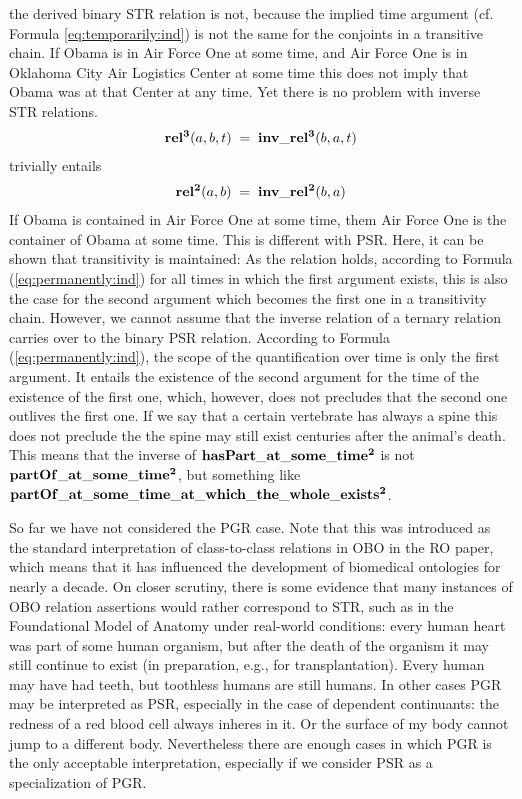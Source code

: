 %
the derived binary STR relation is not, because the implied time argument (cf. Formula \ref{eq:temporarily:ind}) is not the same for the conjoints in a transitive chain. If Obama is in Air Force One at some time, and Air Force One is in Oklahoma City Air Logistics Center at some time this does not imply that Obama was at that Center at any time.
Yet there is no problem with inverse STR relations. 
% 
\begin{equation}
\begin{split}
\mathrm{\mathbf{rel^3}}(a,b,t) \; = \; \mathrm{\mathbf{inv\_rel^3}}(b,a,t)  
\end{split}
\label{eq:trinv}
\end{equation}    
%
trivially entails
%
\begin{equation}
\begin{split}
\mathrm{\mathbf{rel^2}}(a,b) \; = \; \mathrm{\mathbf{inv\_rel^2}}(b,a)  
\end{split}
\label{eq:trinv2}
\end{equation}    
%
If Obama is contained in Air Force One at some time, them Air Force One is the container of Obama at some time.
%
This is different with PSR. Here, it can be shown that transitivity is maintained: As the relation holds, according to Formula (\ref{eq:permanently:ind}) for all times in which the first argument exists, this is also the case for the second argument which becomes the first one in a transitivity chain.
However, we cannot assume that the inverse relation of a ternary relation carries over to the binary PSR relation. According to Formula (\ref{eq:permanently:ind}), the scope of the quantification over time is only the first argument. It entails the existence of the second argument for the time of the existence of the first one, which, however, does not precludes that the second one outlives the first one. If we say that a certain vertebrate has always a spine this does not preclude the the spine may still exist centuries after the animal's death.    
This means that the inverse of $\mathrm{\mathbf{hasPart\_at\_some\_time^2}}$ is not $\mathrm{\mathbf{partOf\_at\_some\_time^2}}$, but something like $\mathrm{\mathbf{partOf\_at\_some\_time\_at\_which\_the\_whole\_exists^2}}$.  

So far we have not considered the PGR case. Note that this was introduced as the standard interpretation of class-to-class relations in OBO in the RO paper, which means that it has influenced the development of biomedical ontologies for nearly a decade. On closer scrutiny, there is some evidence that many instances of OBO relation assertions would rather correspond to STR, such as in the Foundational Model of Anatomy under real-world conditions: every human heart was part of some human organism, but after the death of the organism it may still continue to exist (in preparation, e.g., for transplantation). Every human may have had teeth, but toothless humans are still humans. In other cases PGR may be interpreted as PSR, especially in the case of dependent continuants: the redness of a red blood cell always inheres in it. Or the surface of my body cannot jump to a different body. Nevertheless there are enough cases in which PGR is the only acceptable interpretation, especially if we consider PSR as a specialization of PGR.


